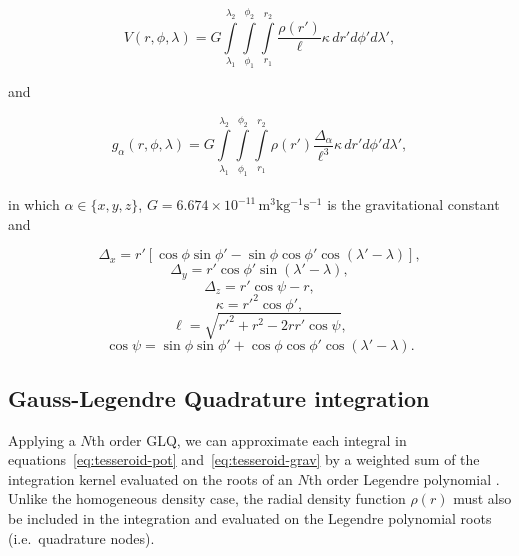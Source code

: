 \documentclass[extra, referee]{gji}
\begin{document}
\begin{equation}
    V(r,\phi,\lambda) = G
    \int\limits_{\lambda_1}^{\lambda_2}
    \int\limits_{\phi_1}^{\phi_2}
    \int\limits_{r_1}^{r_2}
    \frac{\rho(r')}{\ell} \kappa \,  dr' d\phi' d\lambda',
\label{eq:tesseroid-pot}
\end{equation}

\noindent and

\begin{equation}
    g_{\alpha}(r,\phi,\lambda) = G
    \int\limits_{\lambda_1}^{\lambda_2}
    \int\limits_{\phi_1}^{\phi_2}
    \int\limits_{r_1}^{r_2}
    \rho(r') \frac{\Delta_\alpha}{\ell^3}
    \kappa \, dr' d\phi' d\lambda',
\label{eq:tesseroid-grav}
\end{equation}
\\
\noindent in which $\alpha \in \{x, y, z\}$,
$G = 6.674\times10^{-11}\, \text{m$^3$kg$^{-1}$s$^{-1}$}$ is the gravitational constant
and

\begin{equation}
    \Delta_x = r'[\cos\phi\sin\phi' - \sin\phi\cos\phi'
               \cos(\lambda' - \lambda)],
\end{equation}
\begin{equation}
    \Delta_y = r' \cos \phi' \sin(\lambda' - \lambda),
\end{equation}
\begin{equation}
    \Delta_z = r' \cos \psi - r,
\end{equation}
\begin{equation}
    \kappa = {r'}^2 \cos \phi',
\end{equation}
\begin{equation}
    \ell = \sqrt{{r'}^2 + r^2 - 2 r r' \cos \psi},
\label{eq:ell}
\end{equation}
\begin{equation}
    \cos\psi = \sin\phi\sin\phi' + \cos\phi\cos\phi'
                 \cos(\lambda' - \lambda).
\label{eq:cospsi}
\end{equation}


\subsection{Gauss-Legendre Quadrature integration}

Applying a $N$th order GLQ, we can approximate each integral in
equations~\ref{eq:tesseroid-pot} and~\ref{eq:tesseroid-grav} by a weighted sum of the
integration kernel evaluated on the roots of an $N$th order Legendre polynomial
\citep[p.~390]{Hildebrand1987}.
Unlike the homogeneous density case, the radial density function $\rho(r)$ must also be
included in the integration and evaluated on the Legendre polynomial roots
(i.e.~quadrature nodes).
\end{document}

